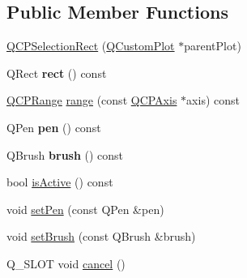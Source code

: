 \subsection*{Public Member Functions}
\begin{DoxyCompactItemize}
\item 
\hyperlink{class_q_c_p_selection_rect_ade6ee59fabcc585a1e281eb527b01867}{Q\+C\+P\+Selection\+Rect} (\hyperlink{class_q_custom_plot}{Q\+Custom\+Plot} $\ast$parent\+Plot)
\item 
\mbox{\label{class_q_c_p_selection_rect_a3812115ae4dfe2855bf1e58331c14805}} 
Q\+Rect {\bfseries rect} () const
\item 
\hyperlink{class_q_c_p_range}{Q\+C\+P\+Range} \hyperlink{class_q_c_p_selection_rect_a23ab082ffa04be1dbf9afb9e633ab815}{range} (const \hyperlink{class_q_c_p_axis}{Q\+C\+P\+Axis} $\ast$axis) const
\item 
\mbox{\label{class_q_c_p_selection_rect_ab4229f8faeaffba9617d2e6c4779b765}} 
Q\+Pen {\bfseries pen} () const
\item 
\mbox{\label{class_q_c_p_selection_rect_a9669c77c5796dea9dc089a088d50ebfb}} 
Q\+Brush {\bfseries brush} () const
\item 
bool \hyperlink{class_q_c_p_selection_rect_ad27c1569c6ea8fa48e24b81e2a302df3}{is\+Active} () const
\item 
void \hyperlink{class_q_c_p_selection_rect_ada20b7fb1b2dcbe50523262636b06963}{set\+Pen} (const Q\+Pen \&pen)
\item 
void \hyperlink{class_q_c_p_selection_rect_ab0c66f1484418782efa01f4153611080}{set\+Brush} (const Q\+Brush \&brush)
\item 
Q\+\_\+\+S\+L\+OT void \hyperlink{class_q_c_p_selection_rect_af67bc58f4f5ce9a4dc420b9c42de235a}{cancel} ()
\end{DoxyCompactItemize}
